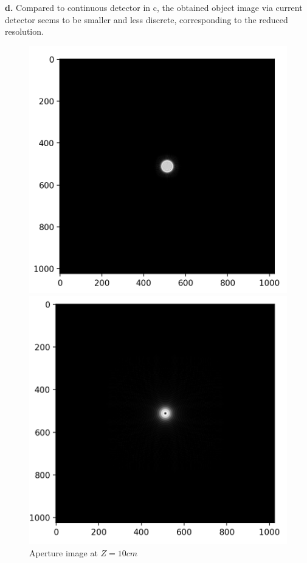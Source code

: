 \documentclass[11pt,a4paper]{article}
\begin{document}
\textbf{d.}
Compared to continuous detector in c, the obtained object image via current detector seems to be smaller and less discrete, corresponding to the reduced resolution. 

\begin{figure}[htb]
    \centering
    \begin{minipage}{0.45\linewidth}
            \includegraphics[width=\textwidth]{HW2_Q6_4.1.png}
            \caption{Aperture image at $Z=10cm$}
            \label{fig:disc_aper10cm}
    \end{minipage}
    \begin{minipage}{0.45\linewidth}
        \includegraphics[width=\textwidth]{HW2_Q6_4.2.png}

\end{minipage}
\end{figure}
\end{document}
